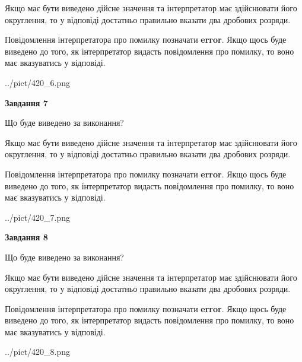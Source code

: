 \documentclass[12pt, ukrainian]{article}
\begin{document}
{\begin {Large}
Якщо має бути виведено дійсне значення та інтерпретатор має здійснювати його округлення, 
то у відповіді достатньо правильно вказати два дробових розряди.

Повідомлення інтерпретатора про помилку позначати \textbf{error}.
Якщо щось буде виведено до того, як інтерпретатор видасть повідомлення про помилку, 
то воно має вказуватись у відповіді. \par

\begin{center}
	{../pict/420_6.png}
\end{center}
\newpage

{\begin {center}\textbf{Завдання 7}\end {center}}\par
Що буде виведено за виконання? \par

Якщо має бути виведено дійсне значення та інтерпретатор має здійснювати його округлення, 
то у відповіді достатньо правильно вказати два дробових розряди.

Повідомлення інтерпретатора про помилку позначати \textbf{error}.
Якщо щось буде виведено до того, як інтерпретатор видасть повідомлення про помилку, 
то воно має вказуватись у відповіді. \par

\begin{center}
	{../pict/420_7.png}
\end{center}
\newpage

{\begin {center}\textbf{Завдання 8}\end {center}}\par
Що буде виведено за виконання? \par

Якщо має бути виведено дійсне значення та інтерпретатор має здійснювати його округлення, 
то у відповіді достатньо правильно вказати два дробових розряди.

Повідомлення інтерпретатора про помилку позначати \textbf{error}.
Якщо щось буде виведено до того, як інтерпретатор видасть повідомлення про помилку, 
то воно має вказуватись у відповіді. \par

\begin{center}
	{../pict/420_8.png}
\end{center}
\newpage


\end{Large}}
\end{document}

